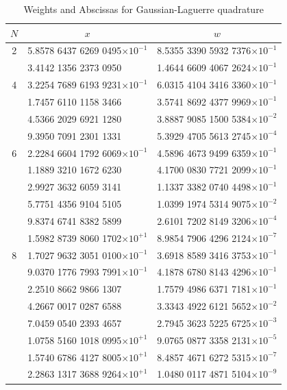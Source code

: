 \begin{table}[h]
\caption{Weights and Abscissas for Gaussian-Laguerre quadrature}
\tiny
\begin{center}
\begin{tabular}{|c|ll|}
\hline
\multicolumn{1}{|c|}{$N$}&\multicolumn{1}{c}{$x$}&\multicolumn{1}{c|}{$w$}\\
\hline
 2
  &5.8578 6437 6269 0495$\times 10^{-1}$ &8.5355 3390 5932 7376$\times 10^{-1}$\\
  &3.4142 1356 2373 0950                 &1.4644 6609 4067 2624$\times 10^{-1}$\\
\hline
4
  &3.2254 7689 6193 9231$\times 10^{-1}$ &6.0315 4104 3416 3360$\times 10^{-1}$\\
  &1.7457 6110 1158 3466 &3.5741 8692 4377 9969$\times 10^{-1}$\\
  &4.5366 2029 6921 1280 &3.8887 9085 1500 5384$\times 10^{-2}$\\
  &9.3950 7091 2301 1331 &5.3929 4705 5613 2745$\times 10^{-4}$\\
\hline
6
  &2.2284 6604 1792 6069$\times 10^{-1}$ &4.5896 4673 9499 6359$\times 10^{-1}$\\
  &1.1889 3210 1672 6230                 &4.1700 0830 7721 2099$\times 10^{-1}$\\
  &2.9927 3632 6059 3141                 &1.1337 3382 0740 4498$\times 10^{-1}$\\
  &5.7751 4356 9104 5105                 &1.0399 1974 5314 9075$\times 10^{-2}$\\
  &9.8374 6741 8382 5899                 &2.6101 7202 8149 3206$\times 10^{-4}$\\
  &1.5982 8739 8060 1702$\times 10^{+1}$ &8.9854 7906 4296 2124$\times 10^{-7}$\\
\hline
8
  &1.7027 9632 3051 0100$\times 10^{-1}$ &3.6918 8589 3416 3753$\times 10^{-1}$\\
  &9.0370 1776 7993 7991$\times 10^{-1}$ &4.1878 6780 8143 4296$\times 10^{-1}$\\
  &2.2510 8662 9866 1307                 &1.7579 4986 6371 7181$\times 10^{-1}$\\
  &4.2667 0017 0287 6588                 &3.3343 4922 6121 5652$\times 10^{-2}$\\
  &7.0459 0540 2393 4657                 &2.7945 3623 5225 6725$\times 10^{-3}$\\
  &1.0758 5160 1018 0995$\times 10^{+1}$ &9.0765 0877 3358 2131$\times 10^{-5}$\\
  &1.5740 6786 4127 8005$\times 10^{+1}$ &8.4857 4671 6272 5315$\times 10^{-7}$\\
  &2.2863 1317 3688 9264$\times 10^{+1}$ &1.0480 0117 4871 5104$\times 10^{-9}$\\
\hline
\end{tabular}\label{tab:Gaussian-Laguerre}
\end{center}
\end{table}


